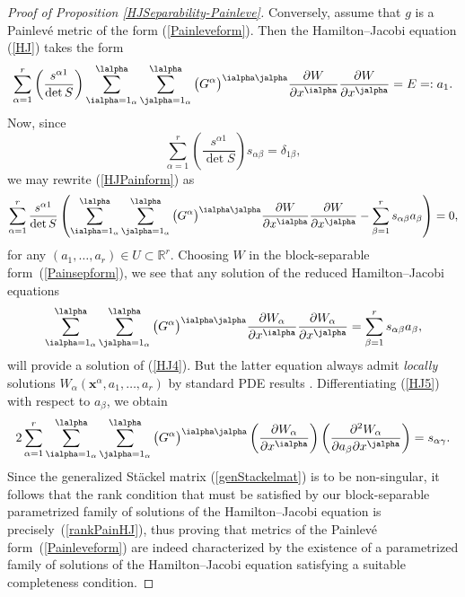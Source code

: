 \begin{proof}[Proof of Proposition \ref{HJSeparability-Painleve}]
Conversely, assume that $g$ is a Painlev\'e metric of the form (\ref{Painleveform}). Then the Hamilton--Jacobi equation (\ref{HJ}) takes the form
\begin{gather}\label{HJPainform}
\sum_{\alpha =1}^{r} \left(\frac{s^{\alpha 1}}{\det S}\right) \sum_{\ialpha =1_{\alpha}}^{\lalpha}\sum_{\jalpha =1_{\alpha}}^{\lalpha} \big(G^{\alpha}\big)^{\ialpha \jalpha}\frac{\partial W}{\partial x^{\ialpha} }\frac{\partial W}{\partial x^{\jalpha}}=E=:a_{1}.
\end{gather}
Now, since
\[
\sum_{\alpha =1}^{r}\left(\frac{s^{\alpha 1}}{\det S}\right)s_{\alpha \beta}=\delta_{1 \beta},
\]
we may rewrite (\ref{HJPainform}) as
\begin{gather} \label{HJ4}
\sum_{\alpha =1}^{r}\frac{s^{\alpha 1}}{\det S}\left(\sum_{\ialpha =1_{\alpha}}^{\lalpha}\sum_{\jalpha =1_{\alpha}}^{\lalpha}\big(G^{\alpha}\big)^{\ialpha \jalpha}\frac{\partial W}{\partial x^{\ialpha} }\frac{\partial W}{\partial x^{\jalpha}}-\sum_{\beta=1}^{r}s_{\alpha \beta}a_{\beta}\right)=0,
\end{gather}
for any $(a_1,\dots,a_r) \in U \subset \mathbb{R}^r$. Choosing $W$ in the block-separable form~(\ref{Painsepform}), we see that any solution of the reduced Hamilton--Jacobi equations
\begin{gather} \label{HJ5}
\sum_{\ialpha =1_{\alpha}}^{\lalpha}\sum_{\jalpha =1_{\alpha}}^{\lalpha}\big(G^{\alpha}\big)^{\ialpha \jalpha}\frac{\partial W_{\alpha}}{\partial x^{\ialpha} }\frac{\partial W_{\alpha}}{\partial x^{\jalpha}}=\sum_{\beta = 1}^{r}s_{\alpha \beta}a_{\beta},
\end{gather}
will provide a solution of (\ref{HJ4}). But the latter equation always admit \emph{locally} solutions $W_\alpha(\textbf{x}^\alpha, \allowbreak a_1,\dots,a_r)$ by standard PDE results \cite{Tay2011a}. Differentiating (\ref{HJ5}) with respect to $a_{\beta}$, we obtain
\begin{gather*} %
2\sum_{\alpha =1}^{r}\sum_{\ialpha =1_{\alpha}}^{\lalpha}\sum_{\jalpha =1_{\alpha}}^{\lalpha}\big(G^{\alpha}\big)^{\ialpha \jalpha}\left(\frac{\partial W_{\alpha}}{\partial x^{\ialpha}}\right)\left( \frac{\partial^{2}W_{\alpha}}{\partial a_{\beta}\partial x^{\jalpha}}\right)=s_{\alpha \gamma}.
\end{gather*}
Since the generalized St\"ackel matrix (\ref{genStackelmat}) is to be non-singular, it follows that the rank condition that must be satisfied by our block-separable parametrized family of solutions of the Hamilton--Jacobi equation is precisely~(\ref{rankPainHJ}), thus proving that metrics of the Painlev\'e form~(\ref{Painleveform}) are indeed characterized by the existence of a parametrized family of solutions of the Hamilton--Jacobi equation satisfying a suitable completeness condition.
\end{proof}

